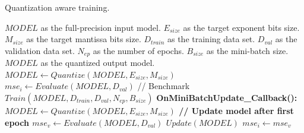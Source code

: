 \begin{algorithm}[h!]
	\label{alg:quantization_integration}
	\caption{Quantization aware training.}
	\begin{algorithmic}
		\SetAlgoLined
		\renewcommand{\algorithmicrequire}{\textbf{input:}}
		\renewcommand{\algorithmicensure}{\textbf{output:}}
		\REQUIRE $MODEL$ as the full-precision input model.
		\REQUIRE $E_{size}$ as the target exponent bits size.
		\REQUIRE $M_{size}$ as the target mantissa bits size.
		\REQUIRE $D_{train}$ as the training data set.
		\REQUIRE $D_{val}$ as the validation data set.
		\REQUIRE $N_{ep}$ as the number of epochs.
		\REQUIRE $B_{size}$ as the mini-batch size.
		\ENSURE $MODEL$ as the quantized output model.
		\STATE $MODEL \gets Quantize(MODEL,E_{size}, M_{size})$
		\STATE $mse_i \gets Evaluate(MODEL, D_{val})$ // Benchmark
		\STATE $Train(MODEL, D_{train}, D_{val}, N_{ep}, B_{size})$
		\STATE
		\STATE \bf{OnMiniBatchUpdate\_Callback():}
		\STATE $MODEL \gets Quantize(MODEL,E_{size}, M_{size})$
		\STATE // Update model after first epoch
		\STATE $mse_v \gets Evaluate(MODEL, D_{val})$
		\STATE $Update(MODEL)$
		\STATE $mse_i \gets mse_v$
		\ENDIF
		\ENDIF
	\end{algorithmic}
\end{algorithm}

